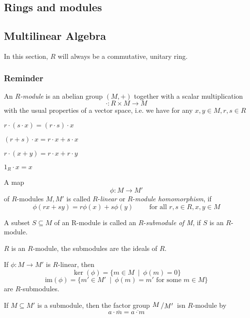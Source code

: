 \documentclass[12pt]{book}
\newcommand{\slant}[2]{{\raisebox{.1em}{$#1$}\left/\raisebox{-.1em}{$#2$}\right.}}
\begin{document}
\begin{spacing}{1.3}
\chapter{Rings and modules}
\thispagestyle{empty}

\setcounter{section}{10}
\renewcommand*\thesection{\S\ \arabic{section}\quad }
\section{Multilinear Algebra}
\renewcommand*\thesection{\arabic{section}}

In this section, $R$ will always be a commutative, unitary ring.

\subsection{Reminder} %
\begin{compactenum}
\item An $R$\textit{-module} is an abelian group $(M,+)$ together with a scalar multiplication
$$\cdot: R \times M \longrightarrow M$$
with the usual properties of a vector space, i.e. we have for any $x,y \in M, r,s \in R$
\begin{compactenum}
\item $r \cdot (s \cdot x)= (r \cdot s) \cdot x$
\item $(r+s)\cdot x= r\cdot x + s \cdot x$
\item $r \cdot (x+y)=r \cdot x + r \cdot y$
\item $1_R \cdot x = x$
\end{compactenum}
\item A map
$$\phi:M \longrightarrow M'$$
of $R$-modules $M, M'$ is called $R$-\textit{linear} or $R$-\textit{module homomorphism}, if 
$$\phi(rx+sy)=r \phi(x)+s\phi(y) \qquad \textrm{ for all } r,s \in R, x,y \in M$$
\item  A subset $S\subseteq M$ of an R-module is called an $R$-\textit{submodule of M}, if $S$ is an $R$-module.
\item $R$ is an $R$-module, the submodules are the ideals of $R$.
\item If $\phi:M \longrightarrow M'$ is $R$-linear, then 
$$\ker(\phi)= \{m \in M\ \mid\ \phi(m)=0\}$$
$$\textrm{im}(\phi)=\{m' \in M'\ \mid\ \phi(m)=m' \textrm{ for some } m \in M\}$$
are $R$-submodules.
\item If $M \subseteq M'$ is a submodule, then the factor group $\slant{M}{M'}$ isn $R$-module by
$$a \cdot \overline{m}= \overline{a\cdot m}$$

\end{compactenum}
\end{spacing}
\end{document}
